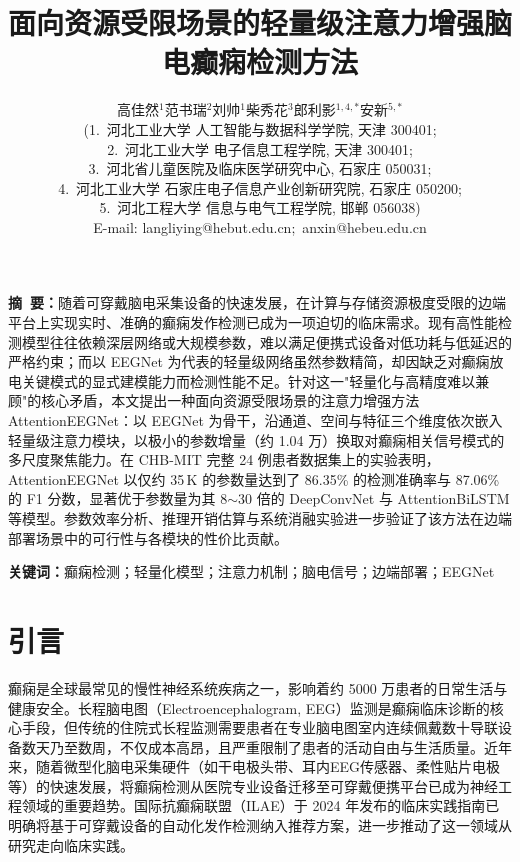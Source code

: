 \documentclass[12pt, a4paper]{article}
\title{\heiti 面向资源受限场景的轻量级注意力增强脑电癫痫检测方法}
\author{
高佳然$^{1}$\quad 范书瑞$^{2}$\quad 刘帅$^{1}$\quad 柴秀花$^{3}$\quad 郎利影$^{1,4,*}$\quad 安新$^{5,*}$\\[6pt]
\small (1.~河北工业大学 人工智能与数据科学学院, 天津 300401;\\
\small 2.~河北工业大学 电子信息工程学院, 天津 300401;\\
\small 3.~河北省儿童医院及临床医学研究中心, 石家庄 050031;\\
\small 4.~河北工业大学 石家庄电子信息产业创新研究院, 石家庄 050200;\\
\small 5.~河北工程大学 信息与电气工程学院, 邯郸 056038)\\[4pt]
\small E-mail: langliying@hebut.edu.cn;~anxin@hebeu.edu.cn
}
\date{}
\begin{document}
\maketitle

\begin{center}
\begin{minipage}{0.92\textwidth}
\noindent\textbf{摘\ 要：}\;随着可穿戴脑电采集设备的快速发展，在计算与存储资源极度受限的边端平台上实现实时、准确的癫痫发作检测已成为一项迫切的临床需求。现有高性能检测模型往往依赖深层网络或大规模参数，难以满足便携式设备对低功耗与低延迟的严格约束；而以 EEGNet 为代表的轻量级网络虽然参数精简，却因缺乏对癫痫放电关键模式的显式建模能力而检测性能不足。针对这一"轻量化与高精度难以兼顾"的核心矛盾，本文提出一种面向资源受限场景的注意力增强方法 AttentionEEGNet：以 EEGNet 为骨干，沿通道、空间与特征三个维度依次嵌入轻量级注意力模块，以极小的参数增量（约 1.04 万）换取对癫痫相关信号模式的多尺度聚焦能力。在 CHB-MIT 完整 24 例患者数据集上的实验表明，AttentionEEGNet 以仅约 35\,K 的参数量达到了 86.35\% 的检测准确率与 87.06\% 的 F1 分数，显著优于参数量为其 8$\sim$30 倍的 DeepConvNet 与 AttentionBiLSTM 等模型。参数效率分析、推理开销估算与系统消融实验进一步验证了该方法在边端部署场景中的可行性与各模块的性价比贡献。

\vspace{6pt}
\noindent\textbf{关键词：}\;癫痫检测；轻量化模型；注意力机制；脑电信号；边端部署；EEGNet
\end{minipage}
\end{center}

\section{引言}

癫痫是全球最常见的慢性神经系统疾病之一，影响着约 5000 万患者的日常生活与健康安全\cite{ref_fisher2017}。长程脑电图（Electroencephalogram, EEG）监测是癫痫临床诊断的核心手段\cite{ref_acharya2018}，但传统的住院式长程监测需要患者在专业脑电图室内连续佩戴数十导联设备数天乃至数周，不仅成本高昂，且严重限制了患者的活动自由与生活质量。近年来，随着微型化脑电采集硬件（如干电极头带、耳内EEG传感器、柔性贴片电极等）的快速发展\cite{ref_roy2019}，将癫痫检测从医院专业设备迁移至可穿戴便携平台已成为神经工程领域的重要趋势。国际抗癫痫联盟（ILAE）于 2024 年发布的临床实践指南已明确将基于可穿戴设备的自动化发作检测纳入推荐方案\cite{ref_beniczky2024}，进一步推动了这一领域从研究走向临床实践。
\end{document}
